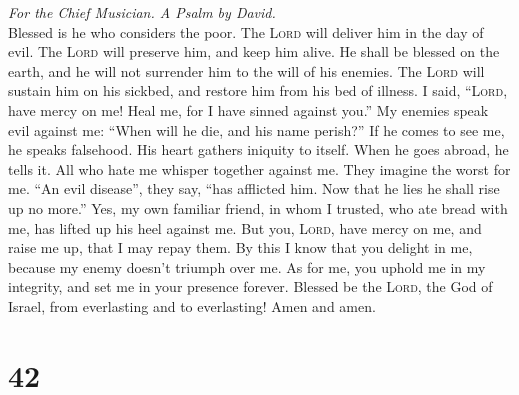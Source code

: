 \emph{For the Chief Musician. A Psalm by David.}\\
 Blessed is he who considers the poor. The \textsc{Lord}
will deliver him in the day of evil.  The \textsc{Lord}
will preserve him, and keep him alive. He shall be blessed on the earth,
and he will not surrender him to the will of his enemies. 
The \textsc{Lord} will sustain him on his sickbed, and restore him from
his bed of illness.  I said, ``\textsc{Lord}, have mercy
on me! Heal me, for I have sinned against you.''  My
enemies speak evil against me: ``When will he die, and his name
perish?''  If he comes to see me, he speaks falsehood. His
heart gathers iniquity to itself. When he goes abroad, he tells it.
 All who hate me whisper together against me. They imagine
the worst for me.  ``An evil disease'', they say, ``has
afflicted him. Now that he lies he shall rise up no more.''
 Yes, my own familiar friend, in whom I trusted, who ate
bread with me, has lifted up his heel against me.  But
you, \textsc{Lord}, have mercy on me, and raise me up, that I may repay
them.  By this I know that you delight in me, because my
enemy doesn't triumph over me.  As for me, you uphold me
in my integrity, and set me in your presence forever. 
Blessed be the \textsc{Lord}, the God of Israel, from everlasting and to
everlasting! Amen and amen.

\hypertarget{section-41}{%
\section{42}\label{section-41}}

